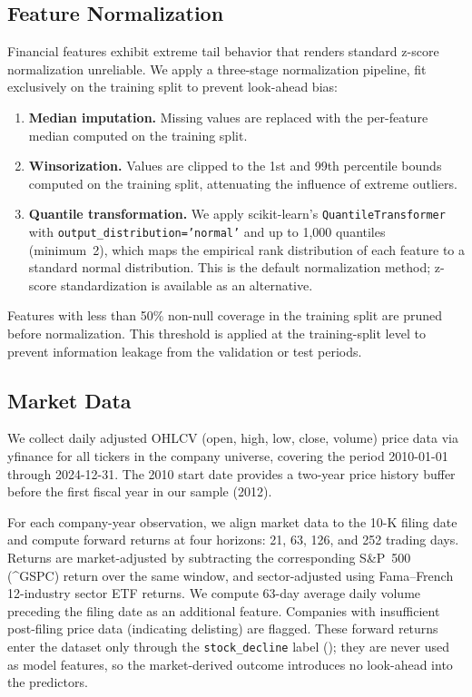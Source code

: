 \subsection{Feature Normalization}
\label{sec:normalization}

Financial features exhibit extreme tail behavior that renders standard z-score normalization unreliable. We apply a three-stage normalization pipeline, fit exclusively on the training split to prevent look-ahead bias:

\begin{enumerate}[leftmargin=*]
  \item \textbf{Median imputation.} Missing values are replaced with the per-feature median computed on the training split.

  \item \textbf{Winsorization.} Values are clipped to the 1st and 99th percentile bounds computed on the training split, attenuating the influence of extreme outliers.

  \item \textbf{Quantile transformation.} We apply scikit-learn's \texttt{Quantile\allowbreak Transformer} with \texttt{output\_distribution='normal'} and up to 1{,}000 quantiles (minimum~2), which maps the empirical rank distribution of each feature to a standard normal distribution. This is the default normalization method; z-score standardization is available as an alternative.
\end{enumerate}

Features with less than 50\% non-null coverage in the training split are pruned before normalization. This threshold is applied at the training-split level to prevent information leakage from the validation or test periods.

\subsection{Market Data}
\label{sec:market}

We collect daily adjusted OHLCV (open, high, low, close, volume) price data via yfinance for all tickers in the company universe, covering the period 2010-01-01 through 2024-12-31. The 2010 start date provides a two-year price history buffer before the first fiscal year in our sample (2012).

For each company-year observation, we align market data to the 10-K filing date and compute forward returns at four horizons: 21, 63, 126, and 252 trading days. Returns are market-adjusted by subtracting the corresponding S\&P~500 (\^{}GSPC) return over the same window, and sector-adjusted using Fama--French 12-industry sector ETF returns. We compute 63-day average daily volume preceding the filing date as an additional feature. Companies with insufficient post-filing price data (indicating delisting) are flagged. These forward returns enter the dataset only through the \texttt{stock\_decline} label (); they are never used as model features, so the market-derived outcome introduces no look-ahead into the predictors.

